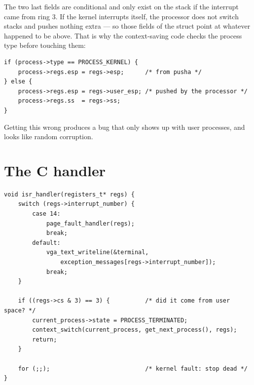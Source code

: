 \begin{center}
\end{center}

\begin{warn}{The two last fields are conditional}
 and  only exist on the stack if the interrupt came from ring 3. If the
kernel interrupts itself, the processor does not switch stacks and pushes nothing extra --- so
those fields of the struct point at whatever happened to be above. That is why the context-saving
code checks the process type before touching them:
\begin{lstlisting}[style=c]
if (process->type == PROCESS_KERNEL) {
    process->regs.esp = regs->esp;      /* from pusha */
} else {
    process->regs.esp = regs->user_esp; /* pushed by the processor */
    process->regs.ss  = regs->ss;
}
\end{lstlisting}
Getting this wrong produces a bug that only shows up with user processes, and looks like random
corruption.
\end{warn}

\section{The C handler}

\begin{lstlisting}[style=c]
void isr_handler(registers_t* regs) {
    switch (regs->interrupt_number) {
        case 14:
            page_fault_handler(regs);
            break;
        default:
            vga_text_writeline(&terminal,
                exception_messages[regs->interrupt_number]);
            break;
    }

    if ((regs->cs & 3) == 3) {          /* did it come from user space? */
        current_process->state = PROCESS_TERMINATED;
        context_switch(current_process, get_next_process(), regs);
        return;
    }

    for (;;);                           /* kernel fault: stop dead */
}
\end{lstlisting}

